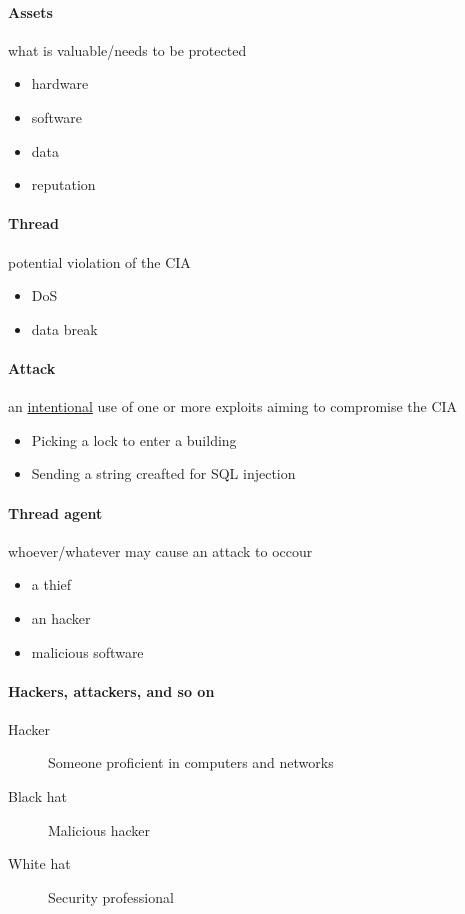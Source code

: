\documentclass{article}
\begin{document}
\paragraph{Assets} what is valuable/needs to be protected
\begin{itemize}
\item hardware
\item software
\item data
\item reputation
\end{itemize}

\paragraph{Thread} potential violation of the CIA
\begin{itemize}
\item DoS
\item data break
\end{itemize}

\paragraph{Attack} an \underline{intentional} use of one or more exploits aiming to compromise the CIA
\begin{itemize}
\item Picking a lock to enter a building
\item Sending a string creafted for SQL injection
\end{itemize}

\paragraph{Thread agent} whoever/whatever may cause an attack to occour
\begin{itemize}
\item a thief
\item an hacker
\item malicious software
\end{itemize}

\paragraph{Hackers, attackers, and so on}
\begin{description}
\item[Hacker] Someone proficient in computers and networks
\item[Black hat] Malicious hacker
\item[White hat] Security professional
\end{description}
\end{document}

